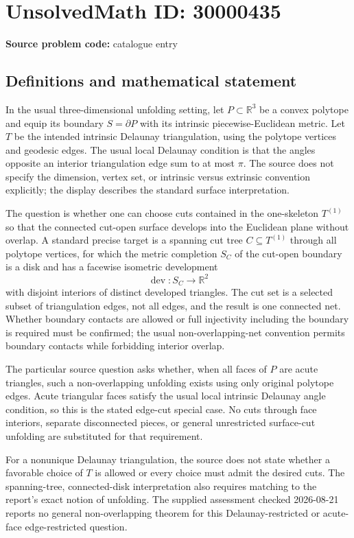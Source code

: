 \documentclass[11pt]{article}
\newcommand{\R}{\mathbb{R}}
\begin{document}
\section*{UnsolvedMath ID: 30000435}
\textbf{Source problem code:} catalogue entry
\subsection{Definitions and mathematical statement}
In the usual three-dimensional unfolding setting, let \(P\subset\R^3\) be a convex polytope and equip its boundary \(S=\partial P\) with its intrinsic piecewise-Euclidean metric. Let \(T\) be the intended intrinsic Delaunay triangulation, using the polytope vertices and geodesic edges. The usual local Delaunay condition is that the angles opposite an interior triangulation edge sum to at most \(\pi\). The source does not specify the dimension, vertex set, or intrinsic versus extrinsic convention explicitly; the display describes the standard surface interpretation.

The question is whether one can choose cuts contained in the one-skeleton \(T^{(1)}\) so that the connected cut-open surface develops into the Euclidean plane without overlap. A standard precise target is a spanning cut tree \(C\subseteq T^{(1)}\) through all polytope vertices, for which the metric completion \(S_C\) of the cut-open boundary is a disk and has a facewise isometric development
\[
\operatorname{dev}:S_C\longrightarrow\R^2
\]
with disjoint interiors of distinct developed triangles. The cut set is a selected subset of triangulation edges, not all edges, and the result is one connected net. Whether boundary contacts are allowed or full injectivity including the boundary is required must be confirmed; the usual non-overlapping-net convention permits boundary contacts while forbidding interior overlap.

The particular source question asks whether, when all faces of \(P\) are acute triangles, such a non-overlapping unfolding exists using only original polytope edges. Acute triangular faces satisfy the usual local intrinsic Delaunay angle condition, so this is the stated edge-cut special case. No cuts through face interiors, separate disconnected pieces, or general unrestricted surface-cut unfolding are substituted for that requirement.

For a nonunique Delaunay triangulation, the source does not state whether a favorable choice of \(T\) is allowed or every choice must admit the desired cuts. The spanning-tree, connected-disk interpretation also requires matching to the report's exact notion of unfolding. The supplied assessment checked 2026-08-21 reports no general non-overlapping theorem for this Delaunay-restricted or acute-face edge-restricted question.
\end{document}
